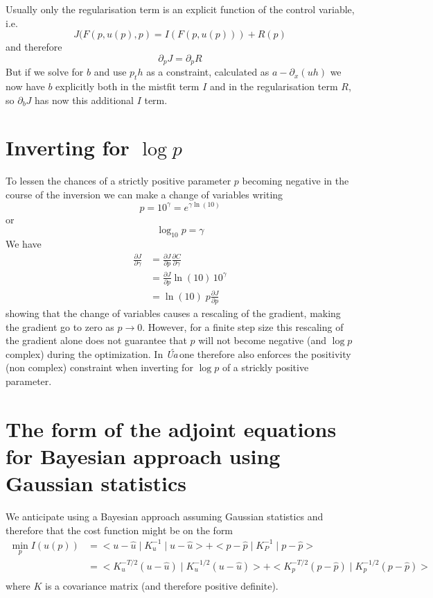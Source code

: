 \documentclass[10pt,a4paper]{book}
\newcommand{\p}{\partial}
\newcommand{\Ua}{\textsl{\'Ua}\,}
\begin{document}
Usually only the regularisation term is an explicit function of the
control variable, i.e.
\[
 J(F(p,u(p),p)=I(F(p,u(p)))+R(p)
\]
and therefore
\[
  \p_p J=  \p_p R 
\]
But if we solve for $b$ and use $p_t h$ as a constraint, calculated as
$a-\p_x (uh)$ we now have $b$ explicitly both in the mistfit term $I$
and in the regularisation term $R$, so $\p_b J$ has now this
additional $I$ term.



\section{Inverting for $\log p$}
To lessen the chances of a strictly positive parameter $p$ becoming
negative in the course of the inversion we can make a change of
variables writing
\[
 p= 10^{\gamma} = e^{\gamma \ln(10)}
\]
or
\[
\log_{10} p =\gamma
\]
We have
\begin{align*}
 \frac{\p J}{\p \gamma} & = \frac{\p J}{\p p}  \frac{\p C}{\p \gamma} \\
                        & = \frac{\p J}{\p p}  \ln(10)  \, 10^{\gamma} \\
                        & = \ln(10) \; p \frac{\p J}{\p p}
\end{align*}
showing that the change of variables causes a rescaling of the
gradient, making the gradient go to zero as $p \to 0$. However, for a
finite step size this rescaling of the gradient alone does not
guarantee that $p$ will not become negative (and $\log p$ complex) during
the optimization. In \Ua one therefore also enforces the positivity
(non complex) constraint when inverting for $\log p$ of a strickly
positive parameter.



\section{The form of the adjoint equations for Bayesian approach using Gaussian statistics}

We anticipate using a Bayesian approach assuming Gaussian statistics
and therefore that the cost function might be on the form
\begin{align*}
  \min_{p} I(u(p))
  &= < u -\hat{u} \mid K_u^{-1} \mid u -\hat{u} > + < p -\hat{p} \mid K_P^{-1} \mid p -\hat{p} >  \\
  &= < K_u^{-T/2}  (u -\hat{u}) \mid K_u^{-1/2} ( u -\hat{u} )> + < K_p^{-T/2}  (p -\hat{p}) \mid K_p^{-1/2} ( p -\hat{p} )>\\
\end{align*}
where $K$ is a covariance matrix (and therefore positive definite).
\end{document}
